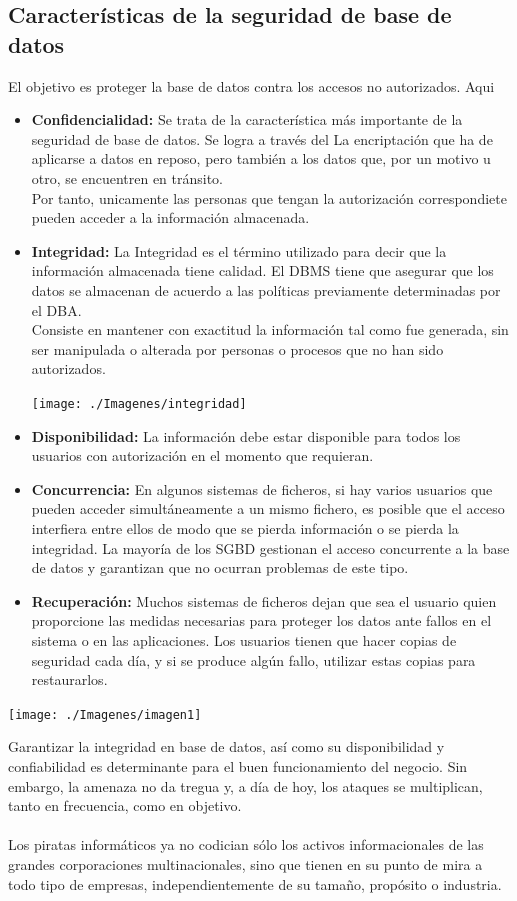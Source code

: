 \documentclass[%
 reprint,
 amsmath,amssymb,
 aps,
]{revtex4-1}
\begin{document}
\subsection{Características de la seguridad de base de datos}
El objetivo es proteger la base de datos contra los accesos no autorizados. Aqui 
\begin{itemize}
\item \textbf{Confidencialidad:} Se trata de la característica más importante de la seguridad de base de datos. Se logra a través del La encriptación que ha de aplicarse a datos en reposo, pero también a los datos que, por un motivo u otro, se encuentren en tránsito. \\ Por tanto, unicamente las personas que tengan la autorización correspondiete pueden acceder a la información almacenada.
\item \textbf{Integridad:} La Integridad es el término utilizado para decir que la información almacenada tiene calidad. El DBMS tiene que asegurar que los datos se almacenan de acuerdo a las políticas previamente determinadas por el DBA. \\ Consiste en mantener con exactitud la información tal como fue generada, sin ser manipulada o alterada por personas o procesos que no han sido autorizados.
\begin{center}
	\texttt{[image: ./Imagenes/integridad]}
\end{center}	
\item \textbf{Disponibilidad:} La información debe estar disponible para todos los usuarios con autorización en el momento que requieran.
\item \textbf{Concurrencia:} En algunos sistemas de ficheros, si hay varios usuarios que pueden acceder simultáneamente a un mismo fichero, es posible que el acceso interfiera entre ellos de modo que se pierda información o se pierda la integridad. La mayoría de los SGBD gestionan el acceso concurrente a la base de datos y garantizan que no ocurran problemas de este tipo.
\item \textbf{Recuperación:} Muchos sistemas de ficheros dejan que sea el usuario quien proporcione las medidas necesarias para proteger los datos ante fallos en el sistema o en las aplicaciones. Los usuarios tienen que hacer copias de seguridad cada día, y si se produce algún fallo, utilizar estas copias para restaurarlos. \cite{web1}
\end{itemize}
\begin{center}
	\texttt{[image: ./Imagenes/imagen1]}
\end{center}	
Garantizar la integridad en base de datos, así como su disponibilidad y confiabilidad es determinante para el buen funcionamiento del negocio. Sin embargo, la amenaza no da tregua y, a día de hoy, los ataques se multiplican, tanto en frecuencia, como en objetivo. \\\\  Los piratas informáticos ya no codician sólo los activos informacionales de las grandes corporaciones multinacionales, sino que tienen en su punto de mira a todo tipo de empresas, independientemente de su tamaño, propósito o industria.
\end{document}
